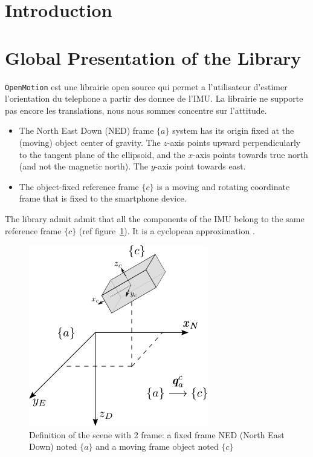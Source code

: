 \documentclass[twocolumn]{bmcart}
\begin{document}
\section{Introduction}


\section{Global Presentation of the Library}


\texttt{OpenMotion} est une librairie open source qui permet a l'utilisateur d'estimer l'orientation du telephone a partir des donnee de l'IMU. La librairie ne supporte pas encore les translations, nous nous sommes concentre sur l'attitude.



\begin{itemize}
\item The North East Down (NED) frame $\{a\}$ system has its origin fixed at the (moving) object center of gravity. The $z$-axis points upward perpendicularly to the tangent plane of the ellipsoid, and the $x$-axis points towards true north (and not the magnetic north). The $y$-axis point towards east.

\vspace{0.1cm}

\item The object-fixed reference frame $\{c\}$ is a moving and rotating coordinate frame that is fixed to the smartphone device. 
\end{itemize}

The library admit admit that all the components of the IMU belong to the same reference frame $\{c\}$ (ref figure~\ref{Schema_situation}). It is a cyclopean approximation \cite{ouarti2008multimodal} .

\begin{figure}[!h]
\centering
\includegraphics[scale=0.55]{images/Schema_situation.png}
\caption{Definition of the scene with 2 frame:  a fixed frame NED (North East Down) noted $\{a\}$ and a moving frame object noted $\{c\}$}
\label{Schema_situation}
\end{figure}
\end{document}
